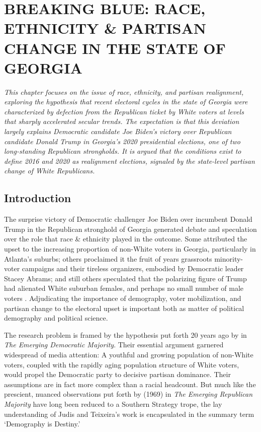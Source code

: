\chapter{BREAKING BLUE: RACE, ETHNICITY \& PARTISAN CHANGE IN THE STATE OF GEORGIA} \label{racechapter}

 \textit{This chapter focuses on the issue of race, ethnicity, and partisan realignment, exploring the hypothesis that recent electoral cycles in the state of Georgia were characterized by defection from the Republican ticket by White voters at levels that sharply accelerated secular trends. The expectation is that this deviation largely explains Democratic candidate Joe Biden's victory over Republican candidate Donald Trump in Georgia's 2020 presidential elections, one of two long-standing Republican strongholds. It is argued that the conditions exist to define 2016 and 2020 as realignment elections, signaled by the state-level partisan change of White Republicans.}

\doublespacing

\section{Introduction}

The surprise victory of Democratic challenger Joe Biden over incumbent Donald Trump in the Republican stronghold of Georgia generated debate and speculation over the role that race \& ethnicity played in the outcome. Some attributed the upset to the increasing proportion of non-White voters in Georgia, particularly in Atlanta's suburbs; others proclaimed it the fruit of years grassroots minority-voter campaigns and their tireless organizers, embodied by Democratic leader Stacey Abrams; and still others speculated that the polarizing figure of Trump had alienated White suburban females, and perhaps no small number of male voters \citep{bailey_stacey_2020, epstein_10-year_2021, cheney-rice_georgia_2020, cohn_why_2021, herndon_future_2020, perry_how_2020, somvichian-clausen_how_2020}. Adjudicating the importance of demography, voter mobilization, and partisan change to the electoral upset is important both as matter of political demography and political science. 

The research problem is framed by the hypothesis put forth 20 years ago by \citet{judis_emerging_2002} in \textit{The Emerging Democratic Majority}. Their essential argument garnered widespread of media attention: A youthful and growing population of non-White voters, coupled with the rapidly aging population structure of White voters, would propel the Democratic party to decisive partisan dominance. Their assumptions are in fact more complex than a racial headcount. But much like the prescient, nuanced observations put forth by \citeauthor{phillips_emerging_2015} (1969) in \textit{The Emerging Republican Majority} have long been reduced to a Southern Strategy trope, the lay understanding of Judis and Teixeira's work is encapsulated in the summary term `Demography is Destiny.' 

